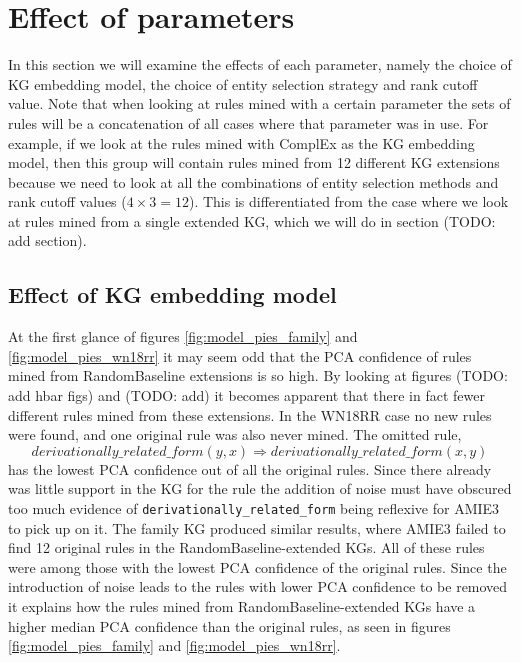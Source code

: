 \section{Effect of parameters}
In this section we will examine the effects of each parameter, namely the choice of KG embedding model, the choice of entity selection strategy and rank cutoff value. Note that when looking at rules mined with a certain parameter the sets of rules will be a concatenation of all cases where that parameter was in use. For example, if we look at the rules mined with ComplEx as the KG embedding model, then this group will contain rules mined from 12 different KG extensions because we need to look at all the combinations of entity selection methods and rank cutoff values ($4\times3=12$). This is differentiated from the case where we look at rules mined from a single extended KG, which we will do in section (TODO: add section).

\subsection{Effect of KG embedding model}
At the first glance of figures \ref{fig:model_pies_family} and \ref{fig:model_pies_wn18rr} it may seem odd that the PCA confidence of rules mined from RandomBaseline extensions is so high. By looking at figures (TODO: add hbar figs) and (TODO: add) it becomes apparent that there in fact fewer different rules mined from these extensions. In the WN18RR case no new rules were found, and one original rule was also never mined. The omitted rule,
\[derivationally\_related\_form(y, x)   \Rightarrow derivationally\_related\_form(x, y)\]
has the lowest PCA confidence out of all the original rules. Since there already was little support in the KG for the rule the addition of noise must have obscured too much evidence of \texttt{derivationally\_related\_form} being reflexive for AMIE3 to pick up on it. The family KG produced similar results, where AMIE3 failed to find 12 original rules in the RandomBaseline-extended KGs. All of these rules were among those with the lowest PCA confidence of the original rules.
Since the introduction of noise leads to the rules with lower PCA confidence to be removed it explains how the rules mined from RandomBaseline-extended KGs have a higher median PCA confidence than the original rules, as seen in figures \ref{fig:model_pies_family} and \ref{fig:model_pies_wn18rr}.

